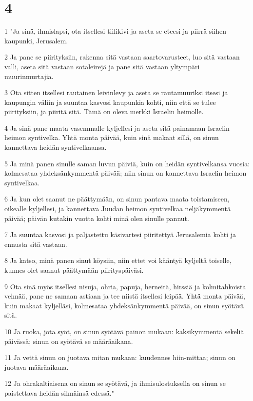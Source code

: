 \chapter{4}

\par 1 "Ja sinä, ihmislapsi, ota itsellesi tiilikivi ja aseta se eteesi ja piirrä siihen kaupunki, Jerusalem.
\par 2 Ja pane se piirityksiin, rakenna sitä vastaan saartovarusteet, luo sitä vastaan valli, aseta sitä vastaan sotaleirejä ja pane sitä vastaan yltympäri muurinmurtajia.
\par 3 Ota sitten itsellesi rautainen leivinlevy ja aseta se rautamuuriksi itsesi ja kaupungin väliin ja suuntaa kasvosi kaupunkia kohti, niin että se tulee piirityksiin, ja piiritä sitä. Tämä on oleva merkki Israelin heimolle.
\par 4 Ja sinä pane maata vasemmalle kyljellesi ja aseta sitä painamaan Israelin heimon syntivelka. Yhtä monta päivää, kuin sinä makaat sillä, on sinun kannettava heidän syntivelkaansa.
\par 5 Ja minä panen sinulle saman luvun päiviä, kuin on heidän syntivelkansa vuosia: kolmesataa yhdeksänkymmentä päivää; niin sinun on kannettava Israelin heimon syntivelkaa.
\par 6 Ja kun olet saanut ne päättymään, on sinun pantava maata toistamiseen, oikealle kyljellesi, ja kannettava Juudan heimon syntivelkaa neljäkymmentä päivää; päivän kutakin vuotta kohti minä olen sinulle pannut.
\par 7 Ja suuntaa kasvosi ja paljastettu käsivartesi piiritettyä Jerusalemia kohti ja ennusta sitä vastaan.
\par 8 Ja katso, minä panen sinut köysiin, niin ettet voi kääntyä kyljeltä toiselle, kunnes olet saanut päättymään piirityspäiväsi.
\par 9 Ota sinä myös itsellesi nisuja, ohria, papuja, herneitä, hirssiä ja kolmitahkoista vehnää, pane ne samaan astiaan ja tee niistä itsellesi leipää. Yhtä monta päivää, kuin makaat kyljelläsi, kolmesataa yhdeksänkymmentä päivää, on sinun syötävä sitä.
\par 10 Ja ruoka, jota syöt, on sinun syötävä painon mukaan: kaksikymmentä sekeliä päivässä; sinun on syötävä se määräaikana.
\par 11 Ja vettä sinun on juotava mitan mukaan: kuudennes hiin-mittaa; sinun on juotava määräaikana.
\par 12 Ja ohrakaltiaisena on sinun se syötävä, ja ihmisulostuksella on sinun se paistettava heidän silmäinsä edessä."
